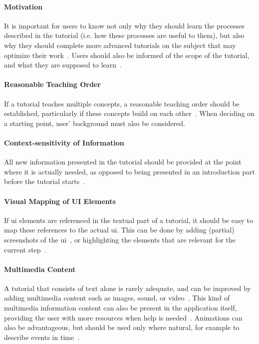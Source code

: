 \paragraph{Motivation} It is important for users to know not only why they should learn the processes described in the tutorial (i.e. how these processes are useful to them), but also why they should complete more advanced tutorials on the subject that may optimize their work~\cite{grossman:software_learnability}. Users should also be informed of the scope of the tutorial, and what they are supposed to learn~\cite{bowerman:tutorial_design}.

\paragraph{Reasonable Teaching Order} If a tutorial teaches multiple concepts, a reasonable teaching order should be established, particularly if these concepts build on each other~\cite{bowerman:tutorial_design}. When deciding on a starting point, user' background must also be considered.

\paragraph{Context-sensitivity of Information} All new information presented in the tutorial should be provided at the point where it is actually needed, as opposed to being presented in an introduction part before the tutorial starts~\cite{andersen:tutorials_impact}.

\paragraph{Visual Mapping of UI Elements} If \gls{ui} elements are referenced in the textual part of a tutorial, it should be easy to map these references to the actual \gls{ui}. This can be done by adding (partial) screenshots of the \gls{ui}~\cite{huang:graphstract}, or highlighting the elements that are relevant for the current step~\cite{kelleher:stencils, bergman:docwizards, grabler:photo_tutorials}.

\paragraph{Multimedia Content} A tutorial that consists of text alone is rarely adequate, and can be improved by adding multimedia content such as images, sound, or video~\cite{grossman:software_learnability}. This kind of multimedia information content can also be present in the application itself, providing the user with more resources when help is needed~\cite{grossman:toolclips}. Animations can also be advantageous, but should be used only where natural, for example to describe events in time~\cite{morrison:animation}.

